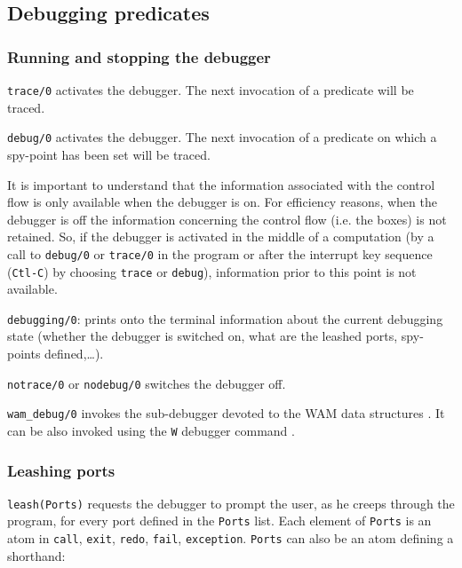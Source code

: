 \subsection{Debugging predicates}

\subsubsection{%
%
%
%
%
%
Running and stopping the debugger \label{Running-and-stopping-the-debugger}}

\texttt{trace/0} activates the debugger. The next invocation of a predicate
will be traced.

\texttt{debug/0} activates the debugger. The next invocation of a predicate
on which a spy-point has been set will be traced.

It is important to understand that the information associated with the control
flow is only available when the debugger is on. For efficiency reasons, when
the debugger is off the information concerning the control flow (i.e. the
boxes) is not retained. So, if the debugger is activated in the middle of a
computation (by a call to \texttt{debug/0} or \texttt{trace/0} in the
program or after the interrupt key sequence (\texttt{Ctl-C}) by choosing
\texttt{trace} or \texttt{debug}), information prior to this point is not
available.

\texttt{debugging/0}: prints onto the terminal information about the current
debugging state (whether the debugger is switched on, what are the leashed
ports, spy-points defined,\ldots).

\texttt{notrace/0} or \texttt{nodebug/0} switches the debugger off.

\texttt{wam\_debug/0} invokes the sub-debugger devoted to the WAM data
structures . It can be also invoked using the
\texttt{W} debugger command .

\subsubsection{%
Leashing ports \label{Leashing-ports}}
   

\texttt{leash(Ports)} requests the debugger to prompt the user, as
he creeps through the program, for every port defined in the \texttt{Ports}
list. Each element of \texttt{Ports} is an atom in \texttt{call},
\texttt{exit}, \texttt{redo}, \texttt{fail}, \texttt{exception}.
\texttt{Ports} can also be an atom defining a shorthand:

